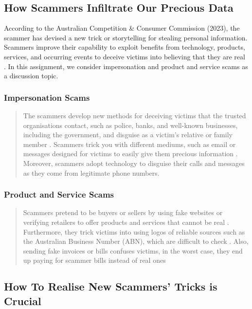 \documentclass[12pt,a4paper]{article}
\begin{document}
\subsection{How Scammers Infiltrate Our Precious Data}
\label{sec:Question 4}

According to the Australian Competition \& Consumer Commission (2023), the scammer has devised a new trick or storytelling for stealing personal information. Scammers improve their capability to exploit benefits from technology, products, services, and occurring events to deceive victims into believing that they are real \citep{question_4}. In this assignment, we consider impersonation and product and service scams as a discussion topic.

\subsubsection{Impersonation Scams}

\begin{quote}
The scammers develop new methods for deceiving victims that the trusted organisations contact, such as police, banks, and well-known businesses, including the government, and disguise as a victim's relative or family member \citep{question_4}. Scammers trick you with different mediums, such as email or messages designed for victims to easily give them precious information \citep{question_4}. Moreover, scammers adopt technology to disguise their calls and messages as they come from legitimate phone numbers.
\end{quote}

\subsubsection{Product and Service Scams}

\begin{quote}
Scammers pretend to be buyers or sellers by using fake websites or verifying retailers to offer products and services that cannot be real \citep{question_4}. Furthermore, they trick victims into using logos of reliable sources such as the Australian Business Number (ABN), which are difficult to check \citep{question_4}. Also, sending fake invoices or bills confuses victims, in the worst case, they end up paying for scammer bills instead of real ones \
\end{quote}

\subsection{How To Realise New Scammers' Tricks is Crucial}
\end{document}
